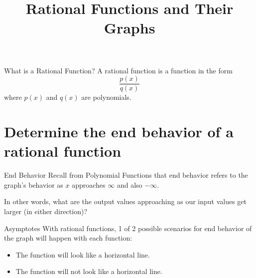 \documentclass[t,usenames,dvipsnames]{beamer}
\title{Rational Functions and Their Graphs}
\author{}
\date{}
\begin{document}
\begin{frame}
    \maketitle
\end{frame}

\begin{frame}{What is a Rational Function?}
    A \alert{rational function} is a function in the form
    \[ \frac{p(x)}{q(x)} \]
    where $p(x)$ and $q(x)$ are polynomials.
\end{frame}

\section{Determine the end behavior of a rational function}

\begin{frame}{End Behavior}
Recall from Polynomial Functions that \alert{end behavior} refers to the graph's behavior as $x$ approaches $\infty$ and also $-\infty$. \newline\\  \pause

In other words, what are the output values approaching as our input values get larger (in either direction)? 
\end{frame}

\begin{frame}{Asymptotes}
With rational functions, 1 of 2 possible scenarios for end behavior of the graph will happen with each function:    \newline\\  \pause
\begin{itemize}
    \item The function will look like a horizontal line.    \newline\\   \pause
    \item The function will not look like a horizontal line.   \newline\\ \pause
\end{itemize}
\end{frame}
\end{document}
